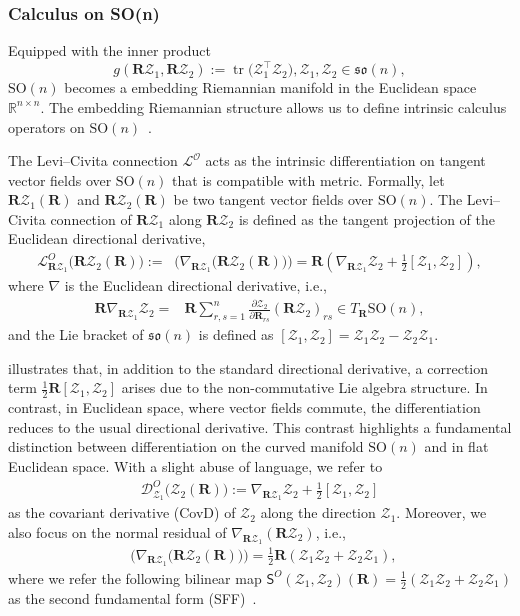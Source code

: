 \documentclass[11pt, a4paper, onecolumn]{article}
\newcommand{\SOn}{\mathrm{SO}(n)}
\newcommand{\son}{\mathfrak{so}(n)}
\newcommand{\LO}{\tg L^{O}}
\newcommand{\DO}{\tg D^{O}}
\newcommand{\SSO}{\nm S^{O}}
\newcommand{\bfR}{\mathbf{R}}
\newcommand{\Z}{\mathcal{Z}}
\renewcommand{\bf}[1]{\mathbf{#1}}
\newcommand{\tg}[1]{\mathcal{#1}}
\newcommand{\nm}[1]{\mathsf{#1}}
\newcommand{\half}{{\frac{1}{2}}}
\DeclareMathOperator{\POtg}{\Pi^O_{T_{\bf R}}}
\DeclareMathOperator{\POnm}{\Pi^O_{N_{\bf R}}}
\newcommand{\Der}[4]{
  #1_{#2}\bigl(#3(#4)\bigr)
}
\begin{document}
\subsubsection{Calculus on SO(n)}\label{subsec:co-der}

Equipped with the inner product 
$$g(\bfR \Z_1,\bfR \Z_2):=\operatorname{tr}\bigl(\Z_1^{\top}\Z_2\bigr), \Z_1,\Z_2\in\son,$$ 
$\SOn$ becomes a embedding Riemannian manifold in the Euclidean space $\mathbb R^{n\times n}$.
The embedding Riemannian structure allows us to define intrinsic calculus operators on $\SOn$~\cite{gallier2020differential}.

The Levi–Civita connection $\tg \LO$ acts as the intrinsic differentiation on tangent vector fields over $\SOn$ that is compatible with metric. Formally, let $\bfR \Z_{1}(\bfR)$ and $\bfR \Z_{2}(\bfR)$ be two tangent vector fields over $\SOn$. The Levi–Civita connection of $\bfR\Z_1$ along $\bfR\Z_2$ is defined as the tangent projection of the Euclidean directional derivative, 
\begin{align}\label{eq:LC-SO}
    \Der{\LO}{\bfR \tg Z_1}{\bfR \tg Z_2}{\bfR} :=  \POtg\bigl( \Der{\nabla}{\bfR\tg Z_1}{\bfR\tg Z_2}{\bfR} \bigr) =\bfR(\nabla_{\bf R\tg Z_1} \tg Z_2 + \half[\tg Z_1, \tg Z_2]),
\end{align}
where $\nabla$ is the Euclidean directional derivative, i.e.,
\begin{align*}
   \bf R\nabla_{ \bf R\tg Z_1} \tg Z_2 = & \bf R \sum_{r,s=1}^n \frac{\partial\tg Z_2}{\partial \bf R_{rs}} (\bf R\tg Z_2)_{rs} \in T_{\bf R}{\SOn},
\end{align*}
and the Lie bracket of $\son$ is defined as $[\Z_1,\Z_2] = \Z_1\Z_2 - \Z_2\Z_1$.

 illustrates that, in addition to the standard directional derivative, a correction term $\half \bfR[\Z_{1},\Z_{2}]$ arises due to the non-commutative Lie algebra structure. In contrast, in Euclidean space, where vector fields commute, the differentiation reduces to the usual directional derivative. This contrast highlights a fundamental distinction between differentiation on the curved manifold $\SOn$ and in flat Euclidean space. With a slight abuse of language, we refer to
\begin{align*}
    \Der{\DO}{\tg Z_1}{\tg Z_2}{\bfR} := \nabla_{\bf R\tg Z_1} \tg Z_2 + \half[\tg Z_1, \tg Z_2]
\end{align*}
as the covariant derivative (CovD) of $\Z_{2}$ along the direction $\Z_{1}$. Moreover, we also focus on the normal residual of $\nabla_{\bf R\tg Z_1} (\bf R\tg Z_2)$, i.e.,
\begin{align*}
      \POnm \Big( \Der{\nabla}{\bfR\tg Z_1}{\bfR\tg Z_2}{\bfR}\Big)=\half \bf R(\Z_1\Z_2+\Z_2\Z_1),
\end{align*}
where we refer the following bilinear map $\SSO(\tg Z_1, \tg Z_2)(\bfR) =\half(\Z_1\Z_2+\Z_2\Z_1)$ as the second fundamental form (SFF)~\cite{lee2018introduction}.
\end{document}
